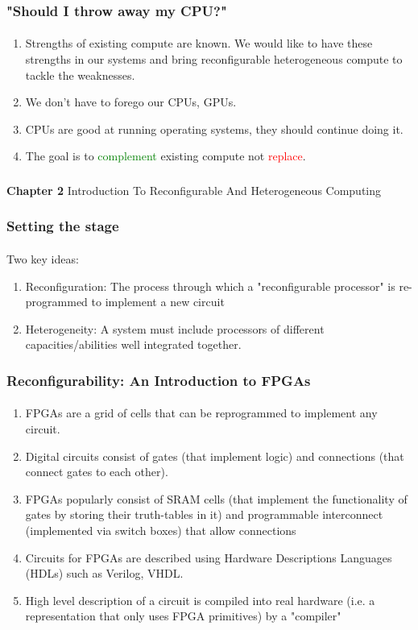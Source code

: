 \documentclass{beamer}
\begin{document}
\begin{frame}[fragile]
  \frametitle{"Should I throw away my CPU?"}
  \framesubtitle{}
  \begin{enumerate}
    \item Strengths of existing compute are known. We would like
      to have these strengths in our systems and bring reconfigurable
      heterogeneous compute to tackle the weaknesses. 
    \item We don't have to forego our CPUs, GPUs.
    \item CPUs are good at running operating systems, they should continue
      doing it. 
    \item The goal is to \textcolor{green}{complement} existing compute not
      \textcolor{red}{replace}.
  \end{enumerate}

\end{frame}

\begin{frame}[c,fragile]
  \frametitle{}

  \centering
  \textbf{Chapter 2}
  \centering
  Introduction To Reconfigurable And Heterogeneous Computing
\end{frame}

\begin{frame}[fragile]
  \frametitle{Setting the stage}
  \framesubtitle{}
    Two key ideas:
      \begin{enumerate}
        \item Reconfiguration: The process through which a "reconfigurable
      processor" is re-programmed to implement a new circuit
        \item Heterogeneity: A system must include processors of different 
          capacities/abilities well integrated together.
      \end{enumerate}
\end{frame}

\begin{frame}[fragile]
\frametitle{Reconfigurability: An Introduction to FPGAs}
\framesubtitle{}
  \begin{enumerate}
    \item FPGAs are a grid of cells that can be reprogrammed to implement
      any circuit. 
    \item Digital circuits consist of gates (that implement logic) and
      connections (that connect gates to each other).
    \item FPGAs popularly consist of SRAM cells (that implement the
      functionality of gates by storing their truth-tables in it) and
      programmable interconnect (implemented via switch boxes) that allow
      connections
    \item Circuits for FPGAs are described using Hardware Descriptions Languages
      (HDLs) such as Verilog, VHDL.
    \item High level description of a circuit is compiled into real hardware
      (i.e. a representation that only uses FPGA primitives) by a "compiler"
  \end{enumerate}

\end{frame}
\end{document}
